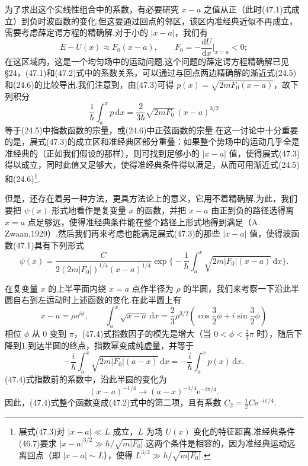 为了求出这个实线性组合中的系数，有必要研究 $x-a$ 之值从正（此时(47.1)式成立）到负时波函数的变化.但这要通过回点的邻区，该区内准经典近似不再成立，需要考虑薛定谔方程的精确解.对于小的 $|x-a|$，我们有
\begin{equation}
  E-U(x)\approx F_0(x-a),\qquad
  F_0=-\frac{\mathrm{d}U}{\mathrm{d}x}\bigg|_{x=a}<0;
\end{equation}
在这区域内，这是一个均匀场中的运动问题.这个问题的薛定谔方程精确解已见§24，(47.1)和(47.2)式中的系数关系，可以通过与回点两边精确解的渐近式(24.5)和(24.6)的比较导出.我们注意到，由(47.3)可得 $p(x)=\sqrt{2mF_0(x-a)}$，故下列积分
\begin{equation*}
  \frac{1}{\hbar}\int_a^x p\,\mathrm{d}x
  =\frac{2}{3\hbar}\sqrt{2mF_0}\,(x-a)^{3/2}
\end{equation*}
等于(24.5)中指数函数的宗量，或(24.6)中正弦函数的宗量.在这一讨论中十分重要的是，展式(47.3)的成立区和准经典区部分重叠：如果整个势场中的运动几乎全是准经典的（正如我们假设的那样），则可找到足够小的 $|x-a|$ 值，使得展式(47.3)得以成立，同时此值又足够大，使得准经典条件得以满足，从而可用渐近式(24.5)和(24.6)\footnote{展式(47.3)对 $|x-a|\ll L$ 成立，$L$ 为场 $U(x)$ 变化的特征距离.准经典条件(46.7)要求 $|x-a|^{3/2}\gg\hbar/\sqrt{m|F_0|}$.这两个条件是相容的，因为准经典运动远离回点（即 $|x-a|\sim L$），使得 $L^{3/2}\gg\hbar/\sqrt{m|F_0|}$.}.

但是，还存在着另一种方法，更具方法论上的意义，它用不着精确解.为此，我们要把 $\psi(x)$ 形式地看作是复变量 $x$ 的函数，并把 $x-a$ 由正到负的路径选得离 $x=a$ 点足够远，使得准经典条件能在整个路径上形式地得到满足（A. Zwaan,1929）.然后我们再来考虑也能满足展式(47.3)的那些 $|x-a|$ 值，使得波函数(47.1)具有下列形式
\begin{equation}
  \psi(x)=\frac{C}{2(2m|F_0|)^{1/4}(x-a)^{1/4}}
  \exp\bigg\{-\frac{1}{\hbar}\int_a^x\sqrt{2m|F_0|(x-a)}\,\mathrm{d}x\bigg\}.
\end{equation}

在复变量 $x$ 的上半平面内绕 $x=a$ 点作半径为 $\rho$ 的半圆，我们来考察一下沿此半圆自右到左运动时上述函数的变化.在此半圆上有
\begin{equation*}
  x-a=\rho\mathrm{e}^{i\phi},\qquad
  \int_a^x\sqrt{x-a}\,\mathrm{d}x
  =\frac{2}{3}\rho^{3/2}\left(\cos\frac{3}{2}\phi+i\sin\frac{3}{2}\phi\right)
\end{equation*}
相位 $\phi$ 从 0 变到 $\pi$，(47.4)式指数因子的模先是增大（当 $0<\phi<\frac{2}{3}\pi$ 时），随后下降到1.到达半圆的终点，指数幂变成纯虚量，并等于
\begin{equation*}
  -\frac{i}{\hbar}\int_a^x\sqrt{2m|F_0|(a-x)}\,\mathrm{d}x
  =-\frac{i}{\hbar}\int_a^x p(x)\,\mathrm{d}x.
\end{equation*}
(47.4)式指数前的系数中，沿此半圆的变化为
\begin{equation*}
  (x-a)^{-1/4}\longrightarrow(a-x)^{-1/4}\mathrm{e}^{-i\pi/4}.
\end{equation*}
因此，(47.4)式整个函数变成(47.2)式中的第二项，且有系数 $C_2=\frac{1}{2}C\mathrm{e}^{-i\pi/4}$.

